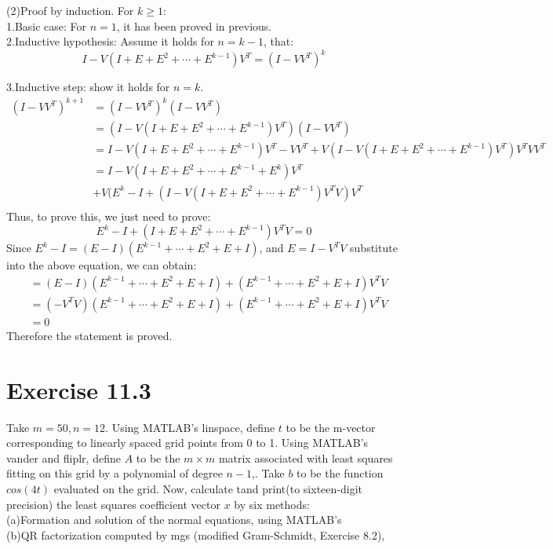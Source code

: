 \documentclass[11pt]{article}
\begin{document}
(2)Proof by induction. For $k \geq 1$:\\

1.Basic case: For $n=1$, it has been proved in previous.\\
 
2.Inductive hypothesis: Assume it holds for $n=k-1$, that:
$$I-V(I+E+E^2+\cdots+E^{k-1})V^T=(I-VV^T)^{k}$$

3.Inductive step: show it holds for $n=k$.
\begin{align*}
(I-VV^T)^{k+1} & = (I-VV^T)^{k}(I-VV^T)\\
& = (I-V(I+E+E^2+\cdots+E^{k-1})V^T)(I-VV^T)\\
& = I-V(I+E+E^2+\cdots+E^{k-1})V^T - VV^T + V(I-V(I+E+E^2+\cdots+E^{k-1})V^T)V^TVV^T\\
& = I-V(I+E+E^2+\cdots+E^{k-1}+E^k)V^T\\
& + V(E^k - I + (I-V(I+E+E^2+\cdots+E^{k-1})V^TV)V^T\\ 
\end{align*}
Thus, to prove this, we just need to prove:
$$E^k - I + (I+E+E^2+\cdots+E^{k-1})V^TV = 0$$
Since $E^k - I = (E - I)(E^{k-1} + \cdots + E^2 + E + I)$, and $E = I - V^TV$ substitute into the above equation, we can obtain:
\begin{align*}
& = (E - I)(E^{k-1} + \cdots + E^2 + E + I) + (E^{k-1} + \cdots + E^2 + E + I)V^TV\\
& = (-V^TV)(E^{k-1} + \cdots + E^2 + E + I) + (E^{k-1} + \cdots + E^2 + E + I)V^TV\\
& = 0
\end{align*}
Therefore the statement is proved.

\section{Exercise 11.3}Take $m=50,n=12$. Using MATLAB's linspace, define $t$ to be the m-vector corresponding to linearly spaced grid points from 0 to 1. Using MATLAB's vander and fliplr, define $A$ to be the $m \times m$ matrix associated with least squares fitting on this grid by a polynomial of degree $n-1$,. Take $b$ to be the function $cos(4t)$ evaluated on the grid. Now, calculate tand print(to sixteen-digit precision) the least squares coefficient vector $x$ by six methods:\\

(a)Formation and solution of the normal equations, using MATLAB's \\

(b)QR factorization computed by mgs (modified Gram-Schmidt, Exercise 8.2),\\
\end{document}
